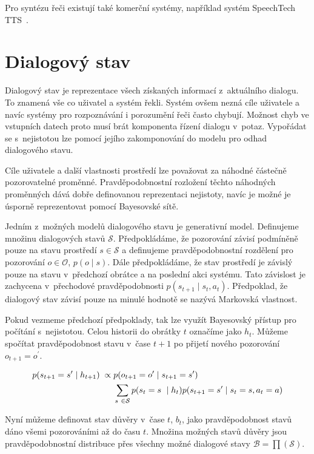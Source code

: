 Pro syntézu řeči existují také komerční systémy, například systém SpeechTech TTS~\cite{speechtech}.

\section{Dialogový stav}

Dialogový stav je reprezentace všech získaných informací z~aktuálního dialogu.
To znamená vše co uživatel a systém řekli.
Systém ovšem nezná cíle uživatele a navíc systémy pro rozpoznávání i porozumění řeči často chybují.
Možnost chyb ve vstupních datech proto musí brát komponenta řízení dialogu v~potaz.
Vypořádat se s~nejistotou lze pomocí jejího zakomponování do modelu pro odhad dialogového stavu.

Cíle uživatele a další vlastnosti prostředí lze považovat za náhodné částečně pozorovatelné proměnné.
Pravděpodobnostní rozložení těchto náhodných proměnných dává dobře definovanou reprezentaci nejistoty, navíc je možné je úsporně reprezentovat pomocí Bayesovské sítě.

Jedním z~možných modelů dialogového stavu je generativní model.
Definujeme množinu dialogových stavů $\mathcal{S}$.
Předpokládáme, že pozorování závisí podmíněně pouze na stavu prostředí $s \in \mathcal{S}$ a definujeme pravděpodobnostní rozdělení pro pozorování $o \in \mathcal{O}$, $p(o \mid s)$.
Dále předpokládáme, že stav prostředí je závislý pouze na stavu v~předchozí obrátce a na poslední akci systému.
Tato závislost je zachycena v~přechodové pravděpodobnosti $p(s_{t+1} \mid s_t, a_t)$.
Předpoklad, že dialogový stav závisí pouze na minulé hodnotě se nazývá Markovská vlastnost.

Pokud vezmeme předchozí předpoklady, tak lze využít Bayesovský přístup pro počítání s~nejistotou.
Celou historii do obrátky $t$ označíme jako $h_t$.
Můžeme spočítat pravděpodobnost stavu v~čase $t+1$ po přijetí nového pozorování $o_{t+1} = o^\prime$.

\begin{align}
\small
p(s_{t+1} = s^\prime \mid h_{t+1}) \; \propto \;& 
    p(o_{t+1} = o^\prime \mid s_{t+1} = s^\prime) \\
    &\sum_{s~\in \mathcal{S}}
        p(s_t = s~\mid h_t)
        p(s_{t+1} = s^\prime \mid s_t = s, a_t = a) \nonumber
\label{eq:beliefupdate}
\end{align}

Nyní můžeme definovat stav důvěry v~čase $t$, $b_t$, jako pravděpodobnost stavů dáno všemi pozorováními až do času $t$.
Množina možných stavů důvěry jsou pravděpodobnostní distribuce přes všechny možné dialogové stavy $\mathcal{B} = \prod(\mathcal{S})$.


